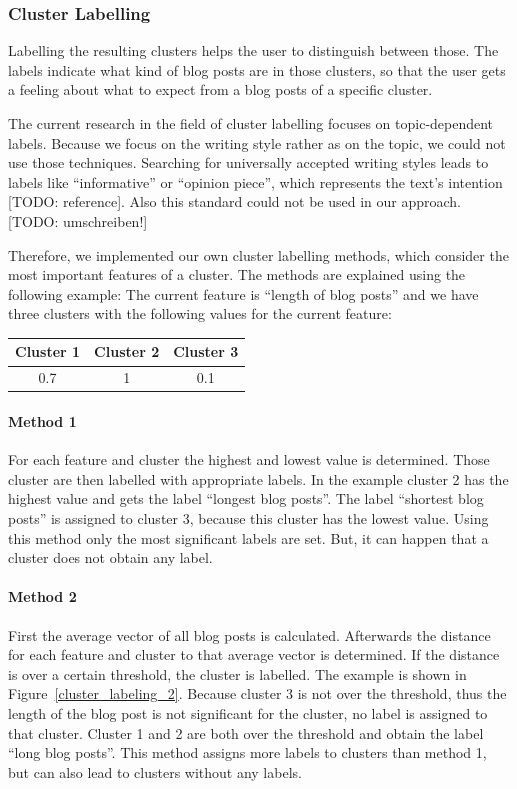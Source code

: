 
\subsubsection{Cluster Labelling}
\label{sec:cluster_labeling}
Labelling the resulting clusters helps the user to distinguish between those.
The labels indicate what kind of blog posts are in those clusters, so that the user gets a feeling about what to expect from a blog posts of a specific cluster.

The current research in the field of cluster labelling focuses on topic-dependent labels.
Because we focus on the writing style rather as on the topic, we could not use those techniques.
Searching for universally accepted writing styles leads to labels like ``informative'' or ``opinion piece'', which represents the text's intention [TODO: reference].
Also this standard could not be used in our approach.
[TODO: umschreiben!]

Therefore, we implemented our own cluster labelling methods, which consider the most important features of a cluster.
The methods are explained using the following example:
The current feature is ``length of blog posts'' and we have three clusters with the following values for the current feature:
\begin{center}
\begin{tabular}{c|c|c}
  Cluster 1 & Cluster 2 & Cluster 3 \\ \hline
  0.7 & 1 & 0.1 \\
 \end{tabular}
\end{center}
\paragraph{Method 1}
For each feature and cluster the highest and lowest value is determined.
Those cluster are then labelled with appropriate labels.
In the example cluster 2 has the highest value and gets the label ``longest blog posts''.
The label ``shortest blog posts'' is assigned to cluster 3, because this cluster has the lowest value.
Using this method only the most significant labels are set.
But, it can happen that a cluster does not obtain any label.

\paragraph{Method 2}
First the average vector of all blog posts is calculated.
Afterwards the distance for each feature and cluster to that average vector is determined.
If the distance is over a certain threshold, the cluster is labelled.
The example is shown in Figure~\ref{cluster_labeling_2}.
Because cluster 3 is not over the threshold, thus the length of the blog post is not significant for the cluster, no label is assigned to that cluster.
Cluster 1 and 2 are both over the threshold and obtain the label ``long blog posts''.
This method assigns more labels to clusters than method 1, but can also lead to clusters without any labels.

